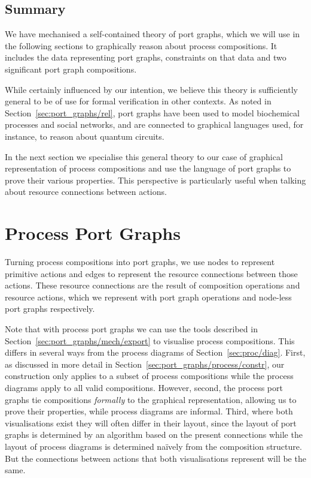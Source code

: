 \documentclass[class=smolathesis,crop=false]{standalone}
\begin{document}
\subsection{Summary}

We have mechanised a self-contained theory of port graphs, which we will use in the following sections to graphically reason about process compositions.
It includes the data representing port graphs, constraints on that data and two significant port graph compositions.

While certainly influenced by our intention, we believe this theory is sufficiently general to be of use for formal verification in other contexts.
As noted in Section~\ref{sec:port_graphs/rel}, port graphs have been used to model biochemical processes and social networks, and are connected to graphical languages used, for instance, to reason about quantum circuits.

In the next section we specialise this general theory to our case of graphical representation of process compositions and use the language of port graphs to prove their various properties.
This perspective is particularly useful when talking about resource connections between actions.

\section{Process Port Graphs}
\label{sec:port_graphs/process}

Turning process compositions into port graphs, we use nodes to represent primitive actions and edges to represent the resource connections between those actions.
These resource connections are the result of composition operations and resource actions, which we represent with port graph operations and node-less port graphs respectively.

\cbstart
Note that with process port graphs we can use the tools described in Section~\ref{sec:port_graphs/mech/export} to visualise process compositions.
This differs in several ways from the process diagrams of Section~\ref{sec:proc/diag}.
First, as discussed in more detail in Section~\ref{sec:port_graphs/process/constr}, our construction only applies to a subset of process compositions while the process diagrams apply to all valid compositions.
However, second, the process port graphs tie compositions \emph{formally} to the graphical representation, allowing us to prove their properties, while process diagrams are informal.
Third, where both visualisations exist they will often differ in their layout, since the layout of port graphs is determined by an algorithm based on the present connections while the layout of process diagrams is determined na\"{i}vely from the composition structure.
But the connections between actions that both visualisations represent will be the same.
\cbend
\end{document}
